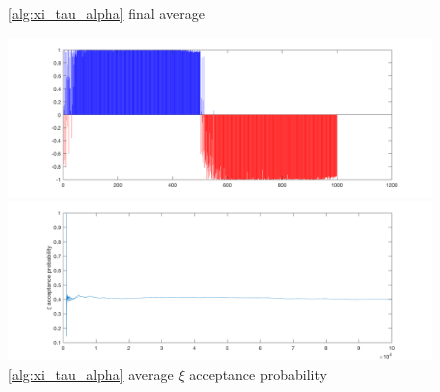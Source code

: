 \documentclass{siamart1116}
\begin{document}
    \begin{figure}[!htb]
        \begin{minipage}{0.48\textwidth}
            \centering
            \caption{\label{fig:moon_noncentered_avg} \cref{alg:xi_tau_alpha} final average}
            \includegraphics[width=\linewidth]{graphics/moons/noncentered/final_avg.png}
        \end{minipage} \hfill
        \begin{minipage}{0.48\textwidth}
            \centering
            \caption{\label{fig:moon_noncentered_accept} \cref{alg:xi_tau_alpha} average $\xi$ acceptance probability}
            \includegraphics[width=\linewidth]{graphics/moons/noncentered/acceptance_xi_probability.png}
        \end{minipage}
    \end{figure}
\end{document}
